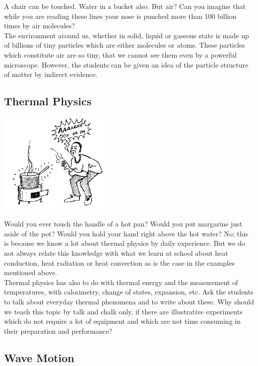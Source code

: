 \begin{multicols}{2}
A chair can be touched. Water in a bucket also. But air? Can you imagine that while you are
reading these lines your nose is punched more than 100 billion times by air molecules?\\

The environment around us, whether in solid, liquid or gaseous state is made up of billions of
tiny particles which are either molecules or atoms. These particles which constitute air are so
tiny, that we cannot see them even by a powerful microscope. However, the students can be
given an idea of the particle structure of matter by indirect evidence.

\subsection{Thermal Physics}

\begin{center}
\includegraphics[width=0.4\textwidth]{./img/source/thermal-physics.png}
\end{center}

Would you ever touch the handle of a hot pan? Would you put margarine just aside
of the pot? Would you hold your hand right above the hot water? No; this is
because we know a lot about thermal physics by daily experience. But we do not always
relate this knowledge with what we learn at school about heat conduction, heat radiation or
heat convection as is the case in the examples mentioned above.\\

Thermal physics has also to do with thermal energy and the measurement of temperatures,
with calorimetry, change of states, expansion, etc. Ask the students to talk about everyday
thermal phenomena and to write about these. Why should we teach this topic by talk and
chalk only, if there are illustrative experiments which do not require a lot of equipment and
which are not time consuming in their preparation and performance?

\subsection{Wave Motion}


\end{multicols}
